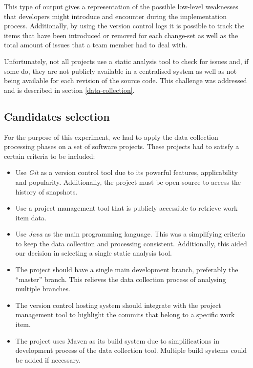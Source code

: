 \documentclass{mpaper}
\begin{document}
This type of output gives a representation of the possible low-level weaknesses
that developers might introduce and encounter during the implementation process.
Additionally, by using the version control logs it is possible to track the
items that have been introduced or removed for each change-set as well as the
total amount of issues that a team member had to deal with. 

Unfortunately, not all projects use a static analysis tool to check for issues
and, if some do, they are not publicly available in a centralised system as well
as not being available for each revision of the source code. This challenge was
addressed and is described in section \ref{data-collection}. 

\subsection{Candidates selection}
\label{data-selection}

For the purpose of this experiment, we had to apply the data collection
processing phases on a set of software projects. These projects had to satisfy a
certain criteria to be included:

\begin{itemize}
  \item Use \emph{Git} as a version control tool due to its powerful features,
  applicability and popularity. Additionally, the project must be open-source to
  access the history of snapshots.
  \item Use a project management tool that is publicly accessible to retrieve
  work item data.
  \item Use \emph{Java} as the main programming language. This was a simplifying
  criteria to keep the data collection and processing consistent. Additionally,
  this aided our decision in selecting a single static analysis tool.
  \item The project should have a single main development branch, preferably the
  ``master'' branch. This relieves the data collection process of analysing
  multiple branches.
  \item The version control hosting system should integrate with the project
  management tool to highlight the commits that belong to a specific work item.
  \item The project uses Maven as its build system due to simplifications in
  development process of the data collection tool. Multiple build systems could
  be added if necessary.
\end{itemize}
\end{document}
